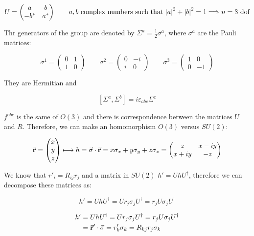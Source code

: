 \documentclass[../../main/main.tex]{subfiles}
\begin{document}
\begin{equation}
	U =
	\begin{pmatrix}
		a	&	b	\\
		-b^*&	a^*
	\end{pmatrix}
	\qquad
	a,b \text{ complex numbers such that } \abs{a}^2 + \abs{b}^2 = 1
	\Longrightarrow
	n=3 \text{ dof}
\end{equation}

Thr generators of the group are denoted by $\Sigma^{a} = \frac{1}{2} \sigma^{a}$, where $\sigma^a$ are the Pauli matrices:

\begin{equation*}
	\sigma^1 =
	\begin{pmatrix}
		0	&	1	\\
		1	&	0
	\end{pmatrix}
	\qquad
	\sigma^2 =
	\begin{pmatrix}
		0	&	-i	\\
		i	&	0
	\end{pmatrix}
	\qquad
	\sigma^3 =
	\begin{pmatrix}
		1	&	0	\\
		0	&	-1
	\end{pmatrix}
\end{equation*}



They are Hermitian and

\[ [ \Sigma^{a}, \Sigma^{b} ] = i \varepsilon _{abc} \Sigma ^{c}   \]

\( f ^{abc} \) is the same of \( O(3) \) and there is correspondence between the matrices \( U \) and \( R \). Therefore, we can make an homomorphism \( O(3) \) versus \( SU(2) \):

\[
	\va{r} = \begin{pmatrix}
	x	\\
	y	\\
	z
	\end{pmatrix}
	\longmapsto
	h = \va{\sigma} \cdot \va{r} = x \sigma _{x} + y \sigma _{y} + z \sigma _{z}
	=
	\begin{pmatrix}
	z   & x-iy \\
	x+iy   & -z
	\end{pmatrix}
\]

We know that \( r'_{i} = R_{ij} r_{j} \) and a matrix in \( SU(2) \) \( h' = UhU ^\dag \), therefore we can decompose these matrices as:

\[
h' = UhU ^\dag  = U r_j \sigma _j U ^\dag  = r_j U \sigma _j U ^\dag
\]

\begin{align*}
	h' 	&= UhU ^\dag  = U r_j \sigma _j U ^\dag  = r_j U \sigma _j U ^\dag 	\\
		&= \va{r}' \cdot \va{\sigma} = r'_k \sigma _k = R _{kj} r_{j} \sigma _k
\end{align*}
\end{document}
